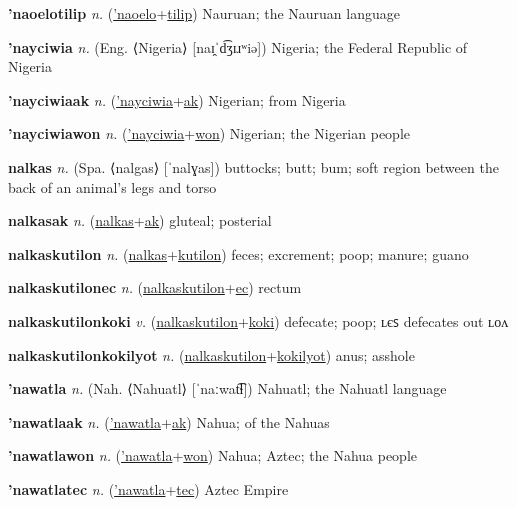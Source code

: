 \textbf{\hypertarget{'naoelotilip}{'naoelotilip}} \textit{n.} (\hyperlink{'naoelo}{'naoelo}+\allowbreak \hyperlink{tilip}{tilip})
Nauruan; the Nauruan language

\textbf{\hypertarget{'nayciwia}{'nayciwia}} \textit{n.} (Eng. ⟨Nigeria⟩ [naɪ̯ˈd͡ʒɪɹʷiə])
Nigeria; the Federal Republic of Nigeria

\textbf{\hypertarget{'nayciwiaak}{'nayciwiaak}} \textit{n.} (\hyperlink{'nayciwia}{'nayciwia}+\allowbreak \hyperlink{ak}{ak})
Nigerian; from Nigeria

\textbf{\hypertarget{'nayciwiawon}{'nayciwiawon}} \textit{n.} (\hyperlink{'nayciwia}{'nayciwia}+\allowbreak \hyperlink{won}{won})
Nigerian; the Nigerian people

\textbf{\hypertarget{nalkas}{nalkas}} \textit{n.} (Spa. ⟨nalgas⟩ [ˈnalɣas])
buttocks; butt; bum; soft region between the back of an animal’s legs and torso

\textbf{\hypertarget{nalkasak}{nalkasak}} \textit{n.} (\hyperlink{nalkas}{nalkas}+\allowbreak \hyperlink{ak}{ak})
gluteal; posterial

\textbf{\hypertarget{nalkaskutilon}{nalkaskutilon}} \textit{n.} (\hyperlink{nalkas}{nalkas}+\allowbreak \hyperlink{kutilon}{kutilon})
feces; excrement; poop; manure; guano

\textbf{\hypertarget{nalkaskutilonec}{nalkaskutilonec}} \textit{n.} (\hyperlink{nalkaskutilon}{nalkaskutilon}+\allowbreak \hyperlink{ec}{ec})
rectum

\textbf{\hypertarget{nalkaskutilonkoki}{nalkaskutilonkoki}} \textit{v.} (\hyperlink{nalkaskutilon}{nalkaskutilon}+\allowbreak \hyperlink{koki}{koki})
defecate; poop; ʟєꜱ defecates out ʟᴏᴧ

\textbf{\hypertarget{nalkaskutilonkokilyot}{nalkaskutilonkokilyot}} \textit{n.} (\hyperlink{nalkaskutilon}{nalkaskutilon}+\allowbreak \hyperlink{kokilyot}{kokilyot})
anus; asshole

\textbf{\hypertarget{'nawatla}{'nawatla}} \textit{n.} (Nah. ⟨Nahuatl⟩ [ˈnaːwat͡ɬ])
Nahuatl; the Nahuatl language

\textbf{\hypertarget{'nawatlaak}{'nawatlaak}} \textit{n.} (\hyperlink{'nawatla}{'nawatla}+\allowbreak \hyperlink{ak}{ak})
Nahua; of the Nahuas

\textbf{\hypertarget{'nawatlawon}{'nawatlawon}} \textit{n.} (\hyperlink{'nawatla}{'nawatla}+\allowbreak \hyperlink{won}{won})
Nahua; Aztec; the Nahua people

\textbf{\hypertarget{'nawatlatec}{'nawatlatec}} \textit{n.} (\hyperlink{'nawatla}{'nawatla}+\allowbreak \hyperlink{tec}{tec})
Aztec Empire

